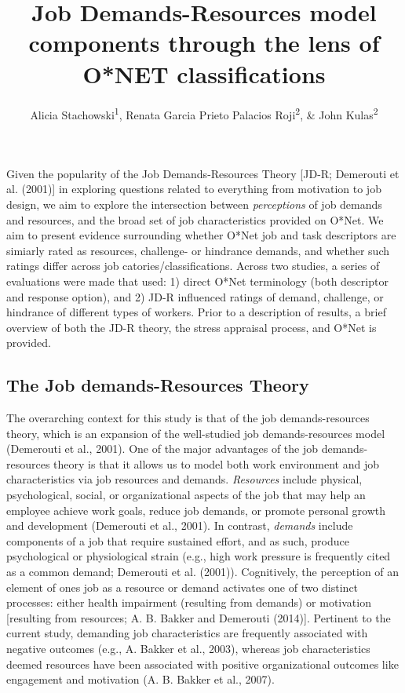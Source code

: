 \documentclass[
  english,
  man]{apa6}
\title{Job Demands-Resources model components through the lens of O*NET classifications}
\author{Alicia Stachowski\textsuperscript{1}, Renata Garcia Prieto Palacios Roji\textsuperscript{2}, \& John Kulas\textsuperscript{2}}
\date{}
\affiliation{\vspace{0.5cm}\textsuperscript{1} University of Wisconsin - Stout\\\textsuperscript{2} Montclair State University}
\begin{document}
\maketitle

Given the popularity of the Job Demands-Resources Theory {[}JD-R; Demerouti et al. (2001){]} in exploring questions related to everything from motivation to job design, we aim to explore the intersection between \emph{perceptions} of job demands and resources, and the broad set of job characteristics provided on O*Net. We aim to present evidence surrounding whether O*Net job and task descriptors are simiarly rated as resources, challenge- or hindrance demands, and whether such ratings differ across job catories/classifications.
Across two studies, a series of evaluations were made that used: 1) direct O*Net terminology (both descriptor and response option), and 2) JD-R influenced ratings of demand, challenge, or hindrance of different types of workers. Prior to a description of results, a brief overview of both the JD-R theory, the stress appraisal process, and O*Net is provided.

\hypertarget{the-job-demands-resources-theory}{%
\subsection{The Job demands-Resources Theory}\label{the-job-demands-resources-theory}}

The overarching context for this study is that of the job demands-resources theory, which is an expansion of the well-studied job demands-resources model (Demerouti et al., 2001). One of the major advantages of the job demands-resources theory is that it allows us to model both work environment and job characteristics via job resources and demands. \emph{Resources} include physical, psychological, social, or organizational aspects of the job that may help an employee achieve work goals, reduce job demands, or promote personal growth and development (Demerouti et al., 2001). In contrast, \emph{demands} include components of a job that require sustained effort, and as such, produce psychological or physiological strain (e.g., high work pressure is frequently cited as a common demand; Demerouti et al. (2001)).
Cognitively, the perception of an element of ones job as a resource or demand activates one of two distinct processes: either health impairment (resulting from demands) or motivation {[}resulting from resources; A. B. Bakker and Demerouti (2014){]}. Pertinent to the current study, demanding job characteristics are frequently associated with negative outcomes (e.g., A. Bakker et al., 2003), whereas job characteristics deemed resources have been associated with positive organizational outcomes like engagement and motivation (A. B. Bakker et al., 2007).
\end{document}
